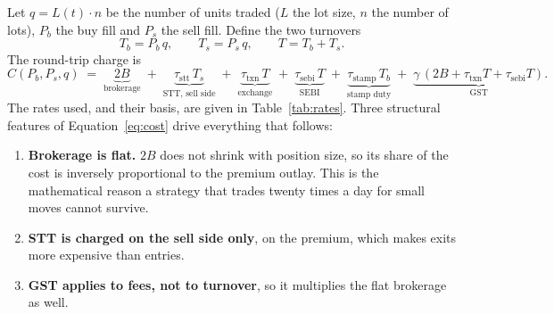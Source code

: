 \documentclass[11pt,a4paper]{article}
\begin{document}
Let $q = L(t)\cdot n$ be the number of units traded ($L$ the lot size, $n$ the number of
lots), $P_b$ the buy fill and $P_s$ the sell fill. Define the two turnovers
\begin{equation}
T_b = P_b\,q, \qquad T_s = P_s\,q, \qquad T = T_b + T_s .
\end{equation}
The round-trip charge is
\begin{equation}
C(P_b,P_s,q) \;=\;
\underbrace{2B}_{\text{brokerage}} \;+\;
\underbrace{\tau_{\text{stt}}\,T_s}_{\text{STT, sell side}} \;+\;
\underbrace{\tau_{\text{txn}}\,T}_{\text{exchange}} \;+\;
\underbrace{\tau_{\text{sebi}}\,T}_{\text{SEBI}} \;+\;
\underbrace{\tau_{\text{stamp}}\,T_b}_{\text{stamp duty}} \;+\;
\underbrace{\gamma\,(2B + \tau_{\text{txn}}T + \tau_{\text{sebi}}T)}_{\text{GST}} .
\label{eq:cost}
\end{equation}
The rates used, and their basis, are given in Table~\ref{tab:rates}. Three structural
features of Equation~\eqref{eq:cost} drive everything that follows:

\begin{enumerate}
  \item \textbf{Brokerage is flat.} $2B$ does not shrink with position size, so its
        share of the cost is inversely proportional to the premium outlay. This is the
        mathematical reason a strategy that trades twenty times a day for small moves
        cannot survive.
  \item \textbf{STT is charged on the sell side only}, on the premium, which makes exits
        more expensive than entries.
  \item \textbf{GST applies to fees, not to turnover}, so it multiplies the flat
        brokerage as well.
\end{enumerate}
\end{document}
